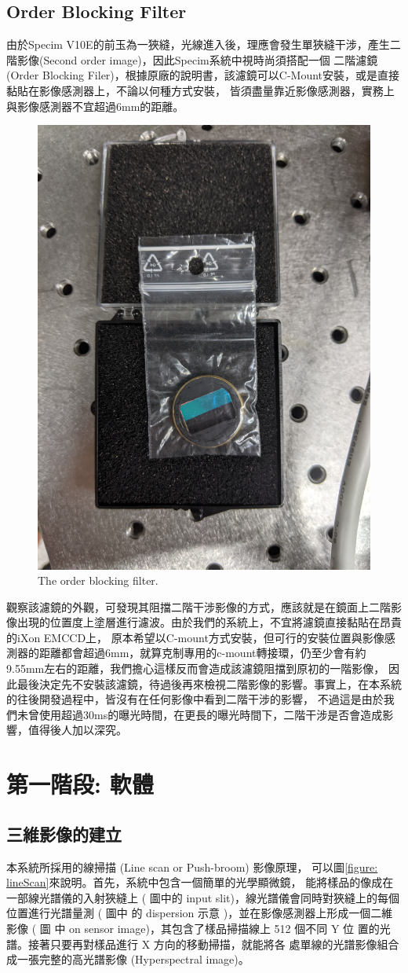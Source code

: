 \documentclass[12pt]{article}
\begin{document}
    \subsection{Order Blocking Filter}
    由於Specim V10E的前玉為一狹縫，光線進入後，理應會發生單狹縫干涉，產生二階影像(Second order image)，因此Specim系統中視時尚須搭配一個
    二階濾鏡(Order Blocking Filer)，根據原廠的說明書，該濾鏡可以C-Mount安裝，或是直接黏貼在影像感測器上，不論以何種方式安裝，
    皆須盡量靠近影像感測器，實務上與影像感測器不宜超過6mm的距離\cite{manual}。
    \begin{figure}[t]
        \centering
        \includegraphics[width=0.5\linewidth]{PXL_20210723_094341395.jpg}
        \caption{The order blocking filter.}
        \label{figure: obf}
    \end{figure}
    觀察該濾鏡的外觀，可發現其阻擋二階干涉影像的方式，應該就是在鏡面上二階影像出現的位置度上塗層進行濾波。由於我們的系統上，不宜將濾鏡直接黏貼在昂貴的iXon EMCCD上，
    原本希望以C-mount方式安裝，但可行的安裝位置與影像感測器的距離都會超過6mm，就算克制專用的c-mount轉接環，仍至少會有約9.55mm左右的距離，我們擔心這樣反而會造成該濾鏡阻擋到原初的一階影像，
    因此最後決定先不安裝該濾鏡，待過後再來檢視二階影像的影響。事實上，在本系統的往後開發過程中，皆沒有在任何影像中看到二階干涉的影響，
    不過這是由於我們未曾使用超過30ms的曝光時間，在更長的曝光時間下，二階干涉是否會造成影響，值得後人加以深究。

    \section{第一階段: 軟體}
    \subsection{三維影像的建立}
    本系統所採用的線掃描 (Line scan or Push-broom) 影像原理，
    可以圖\ref{figure: lineScan}來說明。首先，系統中包含一個簡單的光學顯微鏡，
    能將樣品的像成在一部線光譜儀的入射狹縫上 ( 圖中的 input 
    slit)，線光譜儀會同時對狹縫上的每個位置進行光譜量測 ( 圖中
    的 dispersion 示意 )，並在影像感測器上形成一個二維影像 ( 圖
    中 on sensor image)，其包含了樣品掃描線上 512 個不同 Y 位
    置的光譜。接著只要再對樣品進行 X 方向的移動掃描，就能將各
    處單線的光譜影像組合成一張完整的高光譜影像 (Hyperspectral 
    image)。
\end{document}
